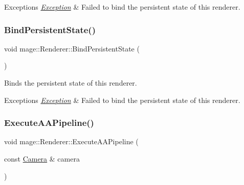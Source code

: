 \begin{DoxyExceptions}{Exceptions}
{\em \hyperlink{classmage_1_1_exception}{Exception}} & Failed to bind the persistent state of this renderer. \\
\hline
\end{DoxyExceptions}
\hypertarget{classmage_1_1_renderer_a0de9d7d913e5f92a75ff2cc075601b9d}{}\label{classmage_1_1_renderer_a0de9d7d913e5f92a75ff2cc075601b9d} 
\subsubsection{\texorpdfstring{Bind\+Persistent\+State()}{BindPersistentState()}}
{\footnotesize\ttfamily void mage\+::\+Renderer\+::\+Bind\+Persistent\+State (\begin{DoxyParamCaption}{ }\end{DoxyParamCaption})}

Binds the persistent state of this renderer.


\begin{DoxyExceptions}{Exceptions}
{\em \hyperlink{classmage_1_1_exception}{Exception}} & Failed to bind the persistent state of this renderer. \\
\hline
\end{DoxyExceptions}
\hypertarget{classmage_1_1_renderer_a9ffd7b8c58e4647b38d864778d53d390}{}\label{classmage_1_1_renderer_a9ffd7b8c58e4647b38d864778d53d390} 
\subsubsection{\texorpdfstring{Execute\+A\+A\+Pipeline()}{ExecuteAAPipeline()}}
{\footnotesize\ttfamily void mage\+::\+Renderer\+::\+Execute\+A\+A\+Pipeline (\begin{DoxyParamCaption}\item[{const \hyperlink{classmage_1_1_camera}{Camera} \&}]{camera }\end{DoxyParamCaption})\hspace{0.3cm}{\ttfamily [private]}}

\hypertarget{classmage_1_1_renderer_a3fb91b8f8f0022e9e8381103c7e23427}{}\label{classmage_1_1_renderer_a3fb91b8f8f0022e9e8381103c7e23427} 
